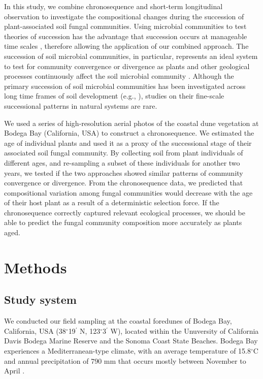 In this study, we combine chronosequence and short-term longitudinal observation to investigate the compositional changes during the succession of plant-associated soil fungal communities.
Using microbial communities to test theories of succession has the advantage that succession occurs at manageable time scales \citep{Fierer2010, Chaparro2013, Gao2019}, therefore allowing the application of our combined approach.
The succession of soil microbial communities, in particular, represents an ideal system to test for community convergence or divergence as plants and other geological processes continuously affect the soil microbial community \citep{BrownJumpponen2014, Castle2016, Dinnage2019}. Although the primary succession of soil microbial communities has been investigated across long time frames of soil development (e.g., \citealp{BrownJumpponen2014, Castle2016}), studies on their fine-scale successional patterns in natural systems are rare. 
\par


We used a series of high-resolution aerial photos of the coastal dune vegetation at Bodega Bay (California, USA) to construct a chronosequence.
We estimated the age of individual plants and used it as a proxy of the successional stage of their associated soil fungal community. By collecting soil from plant individuals of different ages, and re-sampling a subset of these individuals for another two years, we tested if the two approaches showed similar patterns of community convergence or divergence. From the chronosequence data, we predicted that compositional variation among fungal communities would decrease with the age of their host plant as a result of a deterministic selection force. If the chronosequence correctly captured relevant ecological processes, we should be able to predict the fungal community composition more accurately as plants aged. 
\bigskip



\section{Methods}
\subsection*{Study system}
We conducted our field sampling at the coastal foredunes of Bodega Bay, California, USA (38$^{\circ}$19$^\prime$ N, 123$^{\circ}$3$^\prime$ W), located within the Unuversity of California Davis Bodega Marine Reserve and the Sonoma Coast State Beaches. Bodega Bay experiences a Mediterranean-type climate, with an average temperature of 15.8$^{\circ}$C and annual precipitation of 790 mm that occurs mostly between November to April \citep{Conser2009}. 
\par


